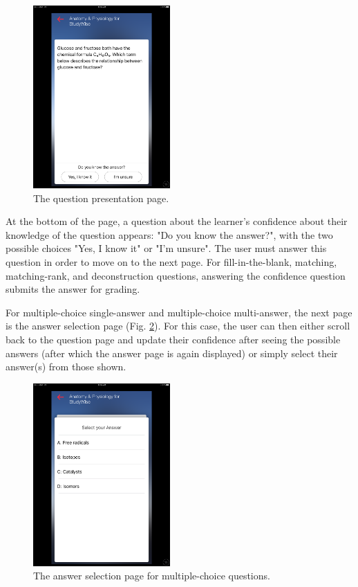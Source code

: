 \documentclass[runningheads,a4paper]{llncs}
\begin{document}
\begin{figure}
\centering
\includegraphics[height=2.75in]{StudyWise_Question_Page}
\caption{The question presentation page.}
\label{fig:Question}
\end{figure}

At the bottom of the page, a question about the learner's confidence about their knowledge of the question appears: "Do you know the answer?", with the two possible choices "Yes, I know it" or "I'm unsure".  The user must answer this question in order to move on to the next page.  For fill-in-the-blank, matching, matching-rank, and deconstruction questions, answering the confidence question submits the answer for grading.  

For multiple-choice single-answer and multiple-choice multi-answer, the next page is the answer selection page (Fig. \ref{fig:AnswerSelect}).  For this case, the user can then either scroll back to the question page and update their confidence after seeing the possible answers (after which the answer page is again displayed) or simply select their answer(s) from those shown.

\begin{figure}
\centering
\includegraphics[height=2.75in]{StudyWise_Answer_Selection_Page}
\caption{The answer selection page for multiple-choice questions.}
\label{fig:AnswerSelect}
\end{figure}
\end{document}
